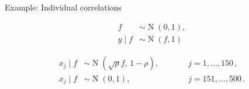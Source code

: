 \documentclass[t]{beamer}
\DeclareMathOperator{\N}{N}
\begin{document}
\begin{frame}{Example: Individual correlations}

\vspace{-1.5\baselineskip}
  
\begin{minipage}[t]{0.3\linewidth}
\begin{equation*}
\begin{alignedat}{1}
  f &  \sim \N(0,1),  \\
  y \mid f &\sim \N(f, 1) 
\end{alignedat}
\end{equation*}
\end{minipage}
  \begin{minipage}[t]{0.4\linewidth}
\begin{equation*}
\begin{alignedat}{2}
  x_j \mid f &\sim \N(\sqrt{\rho}f,\, 1-\rho), \qquad && j = 1,\dots,150 \,, \\
  x_j \mid f &\sim \N(0, 1), && j = 151,\dots, 500 \,.
\end{alignedat}
\end{equation*}
\end{minipage}
\vspace{-0.2\baselineskip}

\center
{}
\vspace{-0.5\baselineskip}


\end{frame}

\end{document}
